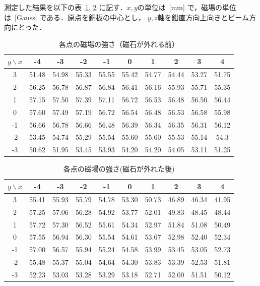 測定した結果を以下の表~\ref{MF1}, \ref{MF2} に記す．$x, y$の単位は~[mm] で，磁場の単位は~[Gauss] である．原点を銅板の中心とし， $y, z$軸を鉛直方向上向きとビーム方向にとった．
\begin{table}[H]
\centering
\caption{各点の磁場の強さ（磁石が外れる前）}\label{MF1}
\begin{tabular}{|c||c|c|c|c|c|c|c|c|c|}\hline
$y \backslash x$ & -4 & -3 & -2 & -1 & 0 & 1 & 2 & 3 & 4 \\ \hline \hline
3 & 51.48 & 54.98 & 55.33 & 55.55 & 55.42 & 54.77 & 54.44 & 53.27 & 51.75 \\ \hline
2 & 56.25 & 56.78 & 56.87 & 56.84 & 56.41 & 56.16 & 55.93 & 55.71 & 55.35 \\ \hline
1 & 57.15 & 57.50 & 57.39 & 57.11 & 56.72 & 56.53 & 56.48 & 56.50 & 56.44 \\ \hline
0 & 57.60 & 57.49 & 57.19 & 56.72 & 56.54 & 56.48 & 56.53 & 56.58 & 55.98 \\ \hline
-1 & 56.66 & 56.78 & 56.66 & 56.48 & 56.39 & 56.34 & 56.35 & 56.31 & 56.12 \\ \hline
-2 & 53.45 & 54.74 & 55.29 & 55.54 & 55.60 & 55.60 & 55.53 & 55.14 & 54.3 \\ \hline
-3 & 50.62 & 51.95 & 53.45 & 53.93 & 54.20 & 54.20 & 54.05 & 53.11 & 51.25 \\ \hline
\end{tabular}
\end{table}
\begin{table}[H]
\centering
\caption{各点の磁場の強さ(磁石が外れた後)}\label{MF2}
\begin{tabular}{|c||c|c|c|c|c|c|c|c|c|}\hline
$y \backslash x$ & -4 & -3 & -2 & -1 & 0 & 1 & 2 & 3 & 4 \\ \hline \hline
3 & 55.41 & 55.93 & 55.79 & 54.78 & 53.30 & 50.73 & 46.89 & 46.34 & 41.95 \\ \hline
2 & 57.25 & 57.06 & 56.28 & 54.92 & 53.77 & 52.01 & 49.83 & 48.45 & 48.44 \\ \hline
1 & 57.72 & 57.30 & 56.52 & 55.61 & 54.34 & 52.97 & 51.84 & 51.08 & 50.49 \\ \hline
0 & 57.55 & 56.94 & 56.30 & 55.54 & 54.61 & 53.67 & 52.98 & 52.40 & 52.34 \\ \hline
-1 & 57.00 & 56.57 & 55.94 & 55.24 & 54.58 & 53.99 & 53.45 & 53.05 & 52.73 \\ \hline
-2 & 55.48 & 55.37 & 55.04 & 54.64 & 54.30 & 53.83 & 53.39 & 52.53 & 51.81 \\ \hline
-3 & 52.23 & 53.03 & 53.28 & 53.29 & 53.18 & 52.71 & 52.00 & 51.51 & 50.12 \\ \hline
\end{tabular}
\end{table}

